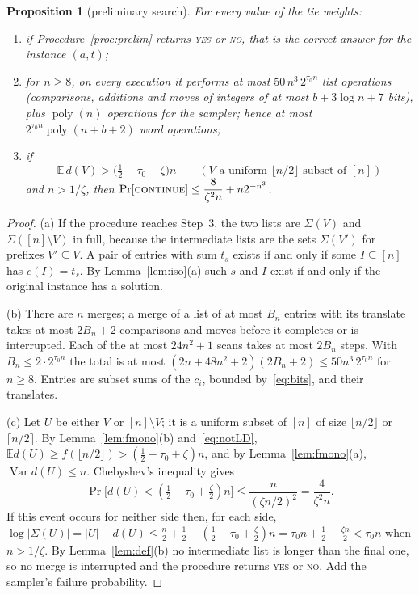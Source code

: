\documentclass[11pt]{article}
\newtheorem{proposition}[lemma]{Proposition}
\theoremstyle{definition}
\newcommand{\E}{\mathbb E}
\newcommand{\abs}[1]{\lvert #1\rvert}
\newcommand{\floor}[1]{\lfloor #1\rfloor}
\newcommand{\ceil}[1]{\lceil #1\rceil}
\newcommand{\poly}{\operatorname{poly}}
\newcommand{\Var}{\operatorname{Var}}
\begin{document}
\begin{proposition}[preliminary search]\label{prop:P}
For every value of the tie weights:
\begin{enumerate}[label=\textup{(\alph*)}]
\item if Procedure~\ref{proc:prelim} returns \textsc{yes} or \textsc{no}, that is the correct answer for the
instance $(a,t)$;
\item for $n\ge8$, on every execution it performs at most $50\,n^3\,2^{\tau_0n}$ list operations (comparisons, additions and
moves of integers of at most $b+3\log n+7$ bits), plus $\poly(n)$ operations for the sampler; hence at most
$2^{\tau_0n}\poly(n+b+2)$ word operations;
\item if
\begin{equation}\label{eq:notLD}
 \E\,d(V)>\bigl(\tfrac12-\tau_0+\zeta\bigr)n\qquad(V\text{ a uniform }\floor{n/2}\text{-subset of }[n])
\end{equation}
and $n>1/\zeta$, then $\Pr[\textsc{continue}]\le\dfrac{8}{\zeta^2n}+n2^{-n^3}$.
\end{enumerate}
\end{proposition}
\begin{proof}
(a) If the procedure reaches Step~3, the two lists are $\Sigma(V)$ and $\Sigma([n]\setminus V)$ in full, because the
intermediate lists are the sets $\Sigma(V')$ for prefixes $V'\subseteq V$. A pair of entries with sum $t_s$ exists if
and only if some $I\subseteq[n]$ has $c(I)=t_s$. By Lemma~\ref{lem:iso}(a) such $s$ and $I$ exist if and only if the
original instance has a solution.

(b) There are $n$ merges; a merge of a list of at most $B_n$ entries with its translate takes at most $2B_n+2$
comparisons and moves before it completes or is interrupted. Each of the at most $24n^2+1$ scans takes at most
$2B_n$ steps. With $B_n\le2\cdot2^{\tau_0n}$ the total is at most $(2n+48n^2+2)(2B_n+2)\le50n^3\,2^{\tau_0n}$ for
$n\ge8$. Entries are subset sums of the $c_i$, bounded by~\eqref{eq:bits}, and their translates.

(c) Let $U$ be either $V$ or $[n]\setminus V$; it is a uniform subset of $[n]$ of size $\floor{n/2}$ or
$\ceil{n/2}$. By Lemma~\ref{lem:fmono}(b) and~\eqref{eq:notLD}, $\E d(U)\ge f(\floor{n/2})>(\tfrac12-\tau_0+\zeta)n$,
and by Lemma~\ref{lem:fmono}(a), $\Var d(U)\le n$. Chebyshev's inequality gives
\[
 \Pr\bigl[d(U)<(\tfrac12-\tau_0+\tfrac\zeta2)n\bigr]\le\frac{n}{(\zeta n/2)^2}=\frac4{\zeta^2n}.
\]
If this event occurs for neither side then, for each side,
$\log\abs{\Sigma(U)}=\abs U-d(U)\le\tfrac n2+\tfrac12-(\tfrac12-\tau_0+\tfrac\zeta2)n=\tau_0n+\tfrac12-\tfrac{\zeta n}2<\tau_0n$
when $n>1/\zeta$. By Lemma~\ref{lem:def}(b) no intermediate list is longer than the final one, so no merge is
interrupted and the procedure returns \textsc{yes} or \textsc{no}. Add the sampler's failure probability.
\end{proof}
\end{document}

